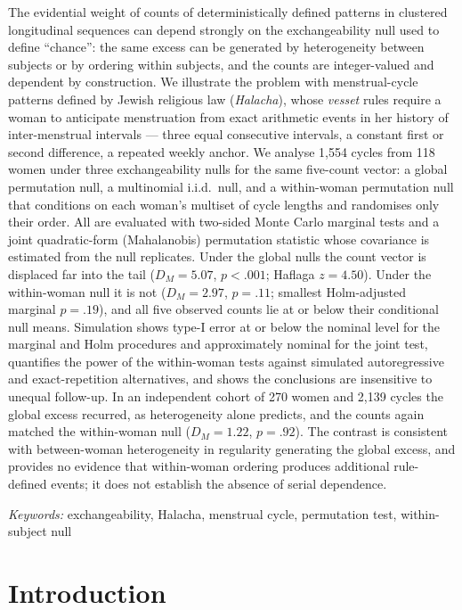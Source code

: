 \documentclass[12pt]{article}
\newcommand{\DM}{D_{M}}
\begin{document}
\noindent
The evidential weight of counts of deterministically defined patterns in clustered
longitudinal sequences can depend strongly on the exchangeability null used to define
``chance'': the same excess
can be generated by heterogeneity between subjects or by ordering within subjects, and
the counts are integer-valued and dependent by construction. We
illustrate the problem with menstrual-cycle patterns defined by Jewish religious law
(\textit{Halacha}), whose \textit{vesset} rules require a woman to anticipate
menstruation from exact arithmetic events in her history of inter-menstrual intervals ---
three equal consecutive intervals, a constant first or second difference, a repeated
weekly anchor. We analyse 1,554 cycles from 118 women under three exchangeability nulls
for the same five-count vector: a global permutation null, a multinomial i.i.d.\ null,
and a within-woman permutation null that conditions on each woman's multiset of cycle
lengths and randomises only their order. All are evaluated with two-sided Monte Carlo
marginal tests and a joint quadratic-form (Mahalanobis) permutation statistic whose
covariance is estimated from the null replicates. Under the global nulls the count
vector is displaced far into the tail ($\DM = 5.07$, $p < .001$; Haflaga $z = 4.50$).
Under the within-woman null it is not ($\DM = 2.97$, $p = .11$; smallest Holm-adjusted
marginal $p = .19$), and all five observed counts lie at or below their conditional null
means. Simulation shows type-I error at or below the nominal level for the marginal and
Holm procedures and approximately nominal for the joint test, quantifies the power of
the within-woman tests against simulated autoregressive and exact-repetition
alternatives, and shows the conclusions are insensitive to unequal follow-up. In an
independent cohort of 270 women and 2,139 cycles the global excess recurred, as
heterogeneity alone predicts, and the counts again matched the within-woman null
($\DM = 1.22$, $p = .92$). The contrast is consistent with between-woman heterogeneity in regularity generating the
global excess, and provides no evidence that within-woman ordering produces additional
rule-defined events; it does not establish the absence of serial dependence.

\medskip
\noindent\textit{Keywords:} exchangeability, Halacha, menstrual cycle, permutation test,
within-subject null

\newpage
\section{Introduction}
\end{document}

